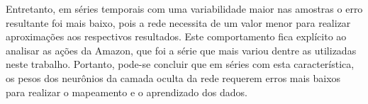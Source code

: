 Entretanto, em séries temporais com uma variabilidade maior nas amostras o erro resultante foi mais baixo, pois a rede necessita de um valor menor para realizar aproximações aos respectivos resultados. Este comportamento fica explícito ao analisar as ações da Amazon, que foi a série que mais variou dentre as utilizadas neste trabalho. Portanto, pode-se concluir que em séries com esta característica, os pesos dos neurônios da camada oculta da rede requerem erros mais baixos para realizar o mapeamento e o aprendizado dos dados. 